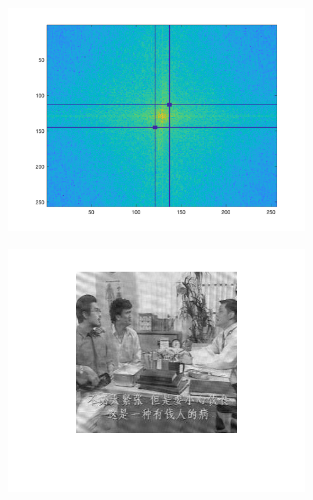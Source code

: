 \documentclass[12pt, a4paper]{article}
\begin{document}
\begin{figure}[H]
    \centering
    \includegraphics[width=0.7\textwidth]{fig26.png}
\end{figure}
\begin{figure}[H]
    \centering
    \includegraphics[width=0.7\textwidth]{fig27.png}
\end{figure}
\newpage
\end{document}
